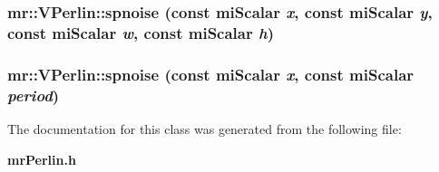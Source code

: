 \subsubsection{ mr::VPerlin::spnoise (const mi\-Scalar {\em x}, const mi\-Scalar {\em y}, const mi\-Scalar {\em w}, const mi\-Scalar {\em h})\hspace{0.3cm}{\tt  [inline, static]}}\label{classmr_1_1VPerlin_e22}


\subsubsection{ mr::VPerlin::spnoise (const mi\-Scalar {\em x}, const mi\-Scalar {\em period})\hspace{0.3cm}{\tt  [inline, static]}}\label{classmr_1_1VPerlin_e21}




The documentation for this class was generated from the following file:\begin{CompactItemize}
\item 
{\bf mr\-Perlin.h}\end{CompactItemize}
